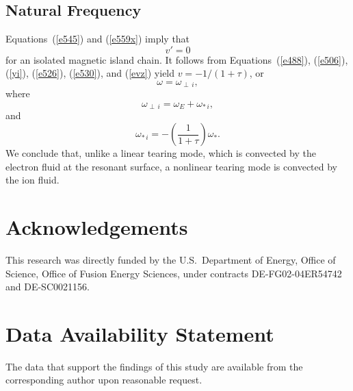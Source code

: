 \documentclass[12pt,prb,aps]{revtex4-1}
\begin{document}
\subsection{Natural Frequency}\label{sphase1}
Equations~(\ref{e545}) and (\ref{e559x}) imply that 
\begin{equation}\label{evz}
v'=0 
\end{equation}
for an isolated magnetic island chain. It follows from
 Equations~(\ref{e488}), (\ref{e506}), (\ref{yi}), (\ref{e526}), (\ref{e530}), and (\ref{evz}) yield $v=-1/(1+\tau)$, or
\begin{equation}\label{e574}
\omega= \omega_{\perp\,i},
\end{equation}
where
\begin{equation}
\omega_{\perp\,i} = \omega_E + \omega_{\ast\,i},
\end{equation}
and
\begin{equation}
\omega_{\ast\,i} = -\left(\frac{1}{1+\tau}\right)\omega_\ast.
\end{equation}
We conclude that, unlike a linear tearing mode, which is convected by the electron fluid at the resonant surface,\cite{ara} a nonlinear
tearing mode is convected by the  ion  fluid.\cite{fw} 

\section*{Acknowledgements}
This research was directly funded by the U.S.\ Department of Energy, Office of Science, Office of Fusion Energy Sciences,  under  contracts DE-FG02-04ER54742 and DE-SC0021156. 
 
\section*{Data Availability Statement}
The data that support the findings of this study are available from the corresponding author upon reasonable request.
\end{document}
